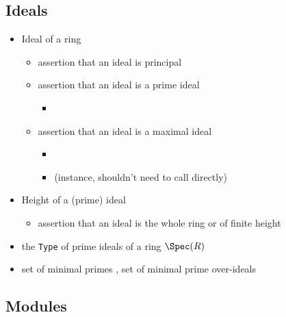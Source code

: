 \subsection{Ideals}

\begin{itemize}
\item
Ideal of a ring 
\begin{itemize}
\item
assertion that an ideal is principal 
\item
assertion that an ideal is a prime ideal 
\begin{itemize}
\item
{}
\end{itemize}
\item
assertion that an ideal is a maximal ideal 
\begin{itemize}
\item
{}
\item
{} (instance, shouldn't need to call directly)
\end{itemize}
\end{itemize}
\item
Height of a (prime) ideal 
\begin{itemize}
\item
assertion that an ideal is the whole ring or of finite height 
\end{itemize}
\item
the \verb|Type| of prime ideals of a ring $\Spec(R)$ 
\item
set of minimal primes ,
set of minimal prime over-ideals 
\end{itemize}

\subsection{Modules}

